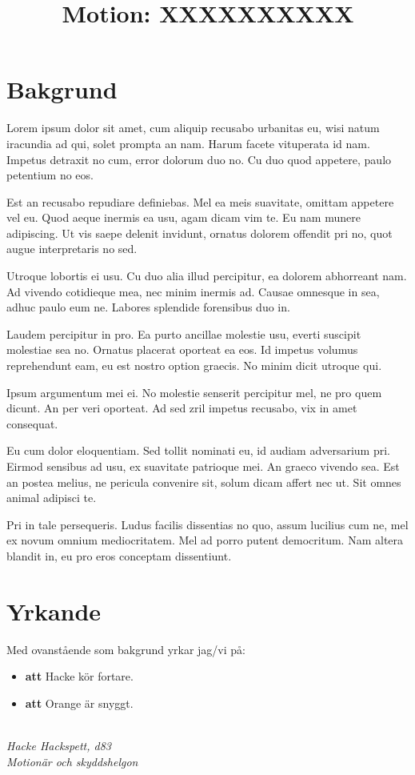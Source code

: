 \documentclass{dtek}
\title{Motion: XXXXXXXXXX}
\begin{document}
\maketitle

\section{Bakgrund}

Lorem ipsum dolor sit amet, cum aliquip recusabo urbanitas eu, wisi natum iracundia ad qui, solet prompta an nam. Harum facete vituperata id nam. Impetus detraxit no cum, error dolorum duo no. Cu duo quod appetere, paulo petentium no eos.

 Est an recusabo repudiare definiebas. Mel ea meis suavitate, omittam appetere vel eu. Quod aeque inermis ea usu, agam dicam vim te. Eu nam munere adipiscing. Ut vis saepe delenit invidunt, ornatus dolorem offendit pri no, quot augue interpretaris no sed.

 Utroque lobortis ei usu. Cu duo alia illud percipitur, ea dolorem abhorreant nam. Ad vivendo cotidieque mea, nec minim inermis ad. Causae omnesque in sea, adhuc paulo eum ne. Labores splendide forensibus duo in.

 Laudem percipitur in pro. Ea purto ancillae molestie usu, everti suscipit molestiae sea no. Ornatus placerat oporteat ea eos. Id impetus volumus reprehendunt eam, eu est nostro option graecis. No minim dicit utroque qui.

 Ipsum argumentum mei ei. No molestie senserit percipitur mel, ne pro quem dicunt. An per veri oporteat. Ad sed zril impetus recusabo, vix in amet consequat.

 Eu cum dolor eloquentiam. Sed tollit nominati eu, id audiam adversarium pri. Eirmod sensibus ad usu, ex suavitate patrioque mei. An graeco vivendo sea. Est an postea melius, ne pericula convenire sit, solum dicam affert nec ut. Sit omnes animal adipisci te.

 Pri in tale persequeris. Ludus facilis dissentias no quo, assum lucilius cum ne, mel ex novum omnium mediocritatem. Mel ad porro putent democritum. Nam altera blandit in, eu pro eros conceptam dissentiunt.



\section{Yrkande}
Med ovanstående som bakgrund yrkar jag/vi på:
\begin{itemize}
\item \textbf{att} Hacke kör fortare.
\item \textbf{att} Orange är snyggt.
\end{itemize}

\ \\
\textit{Hacke Hackspett, d83}\\
\textit{Motionär och skyddshelgon}
\end{document}
